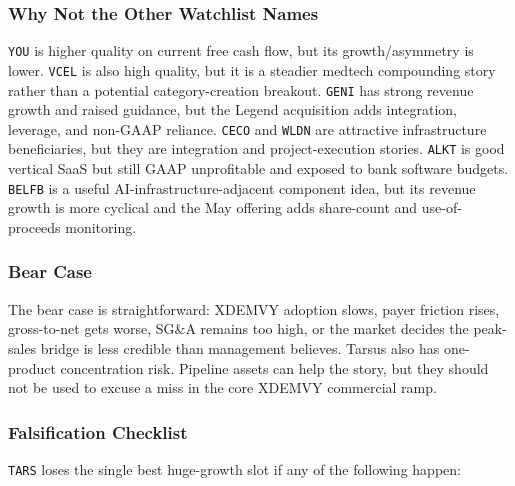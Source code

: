\documentclass[
  9pt,
]{article}
\begin{document}
\hypertarget{why-not-the-other-watchlist-names}{%
\subsubsection{Why Not the Other Watchlist
Names}\label{why-not-the-other-watchlist-names}}

\texttt{YOU} is higher quality on current free cash flow, but its
growth/asymmetry is lower. \texttt{VCEL} is also high quality, but it is
a steadier medtech compounding story rather than a potential
category-creation breakout. \texttt{GENI} has strong revenue growth and
raised guidance, but the Legend acquisition adds integration, leverage,
and non-GAAP reliance. \texttt{CECO} and \texttt{WLDN} are attractive
infrastructure beneficiaries, but they are integration and
project-execution stories. \texttt{ALKT} is good vertical SaaS but still
GAAP unprofitable and exposed to bank software budgets. \texttt{BELFB}
is a useful AI-infrastructure-adjacent component idea, but its revenue
growth is more cyclical and the May offering adds share-count and
use-of-proceeds monitoring.

\hypertarget{bear-case}{%
\subsubsection{Bear Case}\label{bear-case}}

The bear case is straightforward: XDEMVY adoption slows, payer friction
rises, gross-to-net gets worse, SG\&A remains too high, or the market
decides the peak-sales bridge is less credible than management believes.
Tarsus also has one-product concentration risk. Pipeline assets can help
the story, but they should not be used to excuse a miss in the core
XDEMVY commercial ramp.

\hypertarget{falsification-checklist}{%
\subsubsection{Falsification Checklist}\label{falsification-checklist}}

\texttt{TARS} loses the single best huge-growth slot if any of the
following happen:
\end{document}
